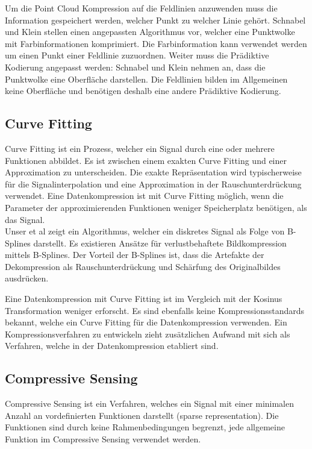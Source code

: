 Um die Point Cloud Kompression auf die Feldlinien anzuwenden muss die Information gespeichert werden, welcher Punkt zu welcher Linie gehört. Schnabel und Klein stellen einen angepassten Algorithmus vor, welcher eine Punktwolke mit Farbinformationen komprimiert. Die Farbinformation kann verwendet werden um einen Punkt einer Feldlinie zuzuordnen. Weiter muss die Prädiktive Kodierung angepasst werden: Schnabel und Klein nehmen an, dass die Punktwolke eine Oberfläche darstellen. Die Feldlinien bilden im Allgemeinen keine Oberfläche und benötigen deshalb eine andere Prädiktive Kodierung.

\subsection{Curve Fitting}
Curve Fitting ist ein Prozess, welcher ein Signal durch eine oder mehrere Funktionen abbildet. Es ist zwischen einem exakten Curve Fitting und einer Approximation zu unterscheiden. Die exakte Repräsentation wird typischerweise für die Signalinterpolation und eine Approximation in der Rauschunterdrückung verwendet. Eine Datenkompression ist mit Curve Fitting möglich, wenn die Parameter der approximierenden Funktionen weniger Speicherplatz benötigen, als das Signal.\\
Unser et al \cite{unser1993b:spline} zeigt ein Algorithmus, welcher ein diskretes Signal als Folge von B-Splines darstellt. Es existieren Ansätze für verlustbehaftete Bildkompression mittels B-Splines\cite{unser1993b2:spline}. Der Vorteil der B-Splines ist, dass die Artefakte der Dekompression als Rauschunterdrückung und Schärfung des Originalbildes ausdrücken.

Eine Datenkompression mit Curve Fitting ist im Vergleich mit der Kosinus Transformation weniger erforscht. Es sind ebenfalls keine Kompressionsstandards bekannt, welche ein Curve Fitting für die Datenkompression verwenden. Ein Kompressionsverfahren zu entwickeln zieht zusätzlichen Aufwand mit sich als Verfahren, welche in der Datenkompression etabliert sind.

\subsection{Compressive Sensing}
Compressive Sensing ist ein Verfahren, welches ein Signal mit einer minimalen Anzahl an vordefinierten Funktionen darstellt (sparse representation). Die Funktionen sind durch keine Rahmenbedingungen begrenzt, jede allgemeine Funktion im Compressive Sensing verwendet werden. 

